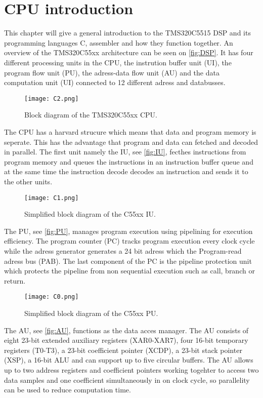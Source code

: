 \chapter{CPU introduction}
This chapter will give a general introduction to the TMS320C5515 DSP and its programming languages C, assembler and how they function together. An overview of the TMS320C55xx architecture can be seen on \autoref{fig:DSP}. It has four different processing units in the CPU, the instrution buffer unit (UI), the program flow unit (PU), the adress-data flow unit (AU) and the data computation unit (UI) connected to 12 different adress and databusses.  
\begin{figure}[H]
\centering
\texttt{[image: C2.png]}
\caption{Block diagram of the TMS320C55xx CPU.}
\label{fig:DSP}
\end{figure}
The CPU has a harvard strucure which means that data and program memory is seperate. This has the advantage that program and data can fetched and decoded in parallel. The first unit namely the IU, see \autoref{fig:IU}, fecthes instructions from program memory and queues the instructions in an instruction buffer queue and at the same time the instruction decode decodes an instruction and sends it to the other units.
\begin{figure}[H]
\centering
\texttt{[image: C1.png]}
\caption{Simplified block diagram of the C55xx IU.}
\label{fig:IU}
\end{figure}
The PU, see \autoref{fig:PU}, manages program execution using pipelining for execution efficiency. The program counter (PC) tracks program execution every clock cycle while the adress generator generates a 24 bit adress which the Program-read adress bus (PAB). The last component of the PC is the pipeline protection unit which protects the pipeline from non sequential execution such as call, branch or return.
\begin{figure}[H]
\centering
\texttt{[image: C0.png]}
\caption{Simplified block diagram of the C55xx PU.}
\label{fig:PU}
\end{figure}
The AU, see \autoref{fig:AU}, functions as the data acces manager. The AU consists of eight 23-bit extended auxiliary registers (XAR0-XAR7), four 16-bit temporary registers (T0-T3), a 23-bit coefficient pointer (XCDP), a 23-bit stack pointer (XSP), a 16-bit ALU and can support up to five circular buffers. The AU allows up to two address registers and coefficient pointers working togehter to access two data samples and one coefficient simultaneously in on clock cycle, so parallelity can be used to reduce computation time. 
